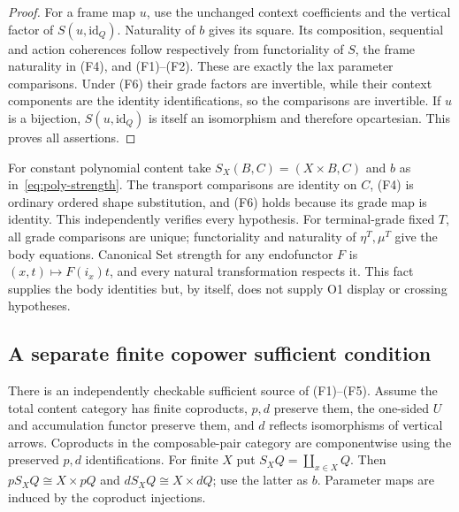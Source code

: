 \documentclass[11pt,a4paper]{article}
\theoremstyle{definition}
\newcommand{\id}{\mathrm{id}}
\begin{document}
\begin{proof}
For a frame map $u$, use the unchanged context coefficients and the vertical
factor of $S(u,\id_Q)$. Naturality of $b$ gives its square. Its composition,
sequential and action coherences follow respectively from functoriality of
$S$, the frame naturality in (F4), and (F1)--(F2). These are exactly the
lax parameter comparisons. Under (F6) their grade factors are invertible,
while their context components are the identity identifications, so the
comparisons are invertible. If $u$ is a bijection, $S(u,\id_Q)$ is itself an
isomorphism and therefore opcartesian. This proves all assertions.
\end{proof}

For constant polynomial content take $S_X(B,C)=(X\times B,C)$ and
$b$ as in~\eqref{eq:poly-strength}. The transport comparisons are identity
on $C$, (F4) is ordinary ordered shape substitution, and (F6) holds because
its grade map is identity. This independently verifies every hypothesis.
For terminal-grade fixed $T$, all grade comparisons are unique;
functoriality and naturality of $\eta^T,\mu^T$ give the body equations.
Canonical Set strength for any endofunctor $F$ is $(x,t)\mapsto F(i_x)t$,
and every natural transformation respects it. This fact supplies the body
identities but, by itself, does not supply O1 display or crossing hypotheses.

\subsection{A separate finite copower sufficient condition}
There is an independently checkable sufficient source of (F1)--(F5).
Assume the total content category has finite coproducts, $p,d$ preserve
them, the one-sided $U$ and accumulation functor preserve them, and $d$
reflects isomorphisms of vertical arrows. Coproducts in the composable-pair
category are componentwise using the preserved $p,d$ identifications.
For finite $X$ put $S_XQ=\coprod_{x\in X}Q$. Then
$pS_XQ\cong X\times pQ$ and $dS_XQ\cong X\times dQ$; use the latter
as $b$. Parameter maps are induced by the coproduct injections.
\end{document}
